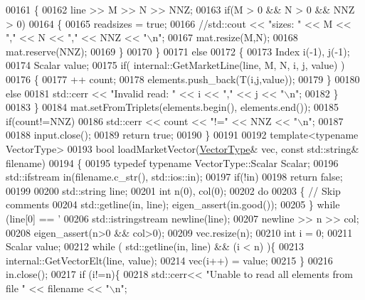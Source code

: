 \begin{DoxyCode}
{{00161     \{
00162       line >> M >> N >> NNZ;
00163       \textcolor{keywordflow}{if}(M > 0 && N > 0 && NNZ > 0) 
00164       \{
00165         readsizes = \textcolor{keyword}{true};
00166         \textcolor{comment}{//std::cout << "sizes: " << M << "," << N << "," << NNZ << "\(\backslash\)n";}
00167         mat.resize(M,N);
00168         mat.reserve(NNZ);
00169       \}
00170     \}
00171     \textcolor{keywordflow}{else}
00172     \{ 
00173       Index i(-1), j(-1);
00174       Scalar value; 
00175       \textcolor{keywordflow}{if}( internal::GetMarketLine(line, M, N, i, j, value) ) 
00176       \{
00177         ++ count;
00178         elements.push\_back(T(i,j,value));
00179       \}
00180       \textcolor{keywordflow}{else} 
00181         std::cerr << \textcolor{stringliteral}{"Invalid read: "} << i << \textcolor{stringliteral}{","} << j << \textcolor{stringliteral}{"\(\backslash\)n"};        
00182     \}
00183   \}
00184   mat.setFromTriplets(elements.begin(), elements.end());
00185   \textcolor{keywordflow}{if}(count!=NNZ)
00186     std::cerr << count << \textcolor{stringliteral}{"!="} << NNZ << \textcolor{stringliteral}{"\(\backslash\)n"};
00187   
00188   input.close();
00189   \textcolor{keywordflow}{return} \textcolor{keyword}{true};
00190 \}
00191 
00192 \textcolor{keyword}{template}<\textcolor{keyword}{typename} VectorType>
00193 \textcolor{keywordtype}{bool} loadMarketVector(\hyperlink{struct_vector_type}{VectorType}& vec, \textcolor{keyword}{const} std::string& filename)
00194 \{
00195    \textcolor{keyword}{typedef} \textcolor{keyword}{typename} VectorType::Scalar Scalar;
00196   std::ifstream in(filename.c\_str(), std::ios::in);
00197   \textcolor{keywordflow}{if}(!in)
00198     \textcolor{keywordflow}{return} \textcolor{keyword}{false};
00199   
00200   std::string line; 
00201   \textcolor{keywordtype}{int} n(0), col(0); 
00202   \textcolor{keywordflow}{do} 
00203   \{ \textcolor{comment}{// Skip comments}
00204     std::getline(in, line); eigen\_assert(in.good());
00205   \} \textcolor{keywordflow}{while} (line[0] == \textcolor{charliteral}{'%
00206   std::istringstream newline(line);
00207   newline  >> n >> col; 
00208   eigen\_assert(n>0 && col>0);
00209   vec.resize(n);
00210   \textcolor{keywordtype}{int} i = 0; 
00211   Scalar value; 
00212   \textcolor{keywordflow}{while} ( std::getline(in, line) && (i < n) )\{
00213     internal::GetVectorElt(line, value); 
00214     vec(i++) = value; 
00215   \}
00216   in.close();
00217   \textcolor{keywordflow}{if} (i!=n)\{
00218     std::cerr<< \textcolor{stringliteral}{"Unable to read all elements from file "} << filename << \textcolor{stringliteral}{"\(\backslash\)n"};
}}}
\end{DoxyCode}
